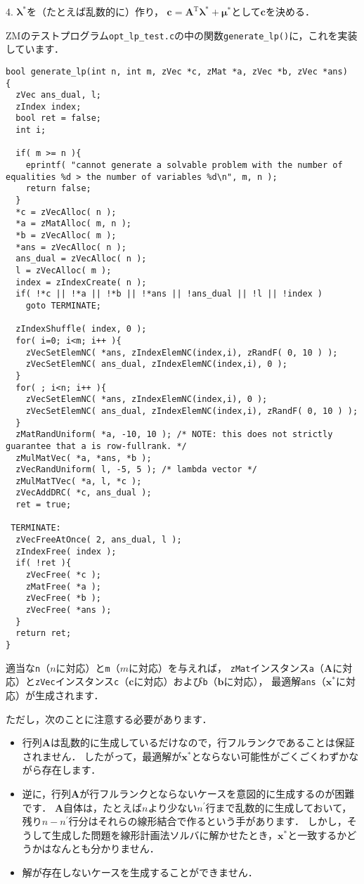 ﻿\documentclass[a4paper]{jsarticle}
\begin{document}
4. $\boldsymbol{\lambda}^{*}$を（たとえば乱数的に）作り，
$\boldsymbol{c}=\boldsymbol{A}^{\mathrm{T}}\boldsymbol{\lambda}^{*}+\boldsymbol{\mu}^{*}$として$\boldsymbol{c}$を決める．

ZMのテストプログラム\verb|opt_lp_test.c|の中の関数\verb|generate_lp()|に，これを実装しています．
\begin{verbatim}
bool generate_lp(int n, int m, zVec *c, zMat *a, zVec *b, zVec *ans)
{
  zVec ans_dual, l;
  zIndex index;
  bool ret = false;
  int i;

  if( m >= n ){
    eprintf( "cannot generate a solvable problem with the number of equalities %d > the number of variables %d\n", m, n );
    return false;
  }
  *c = zVecAlloc( n );
  *a = zMatAlloc( m, n );
  *b = zVecAlloc( m );
  *ans = zVecAlloc( n );
  ans_dual = zVecAlloc( n );
  l = zVecAlloc( m );
  index = zIndexCreate( n );
  if( !*c || !*a || !*b || !*ans || !ans_dual || !l || !index )
    goto TERMINATE;

  zIndexShuffle( index, 0 );
  for( i=0; i<m; i++ ){
    zVecSetElemNC( *ans, zIndexElemNC(index,i), zRandF( 0, 10 ) );
    zVecSetElemNC( ans_dual, zIndexElemNC(index,i), 0 );
  }
  for( ; i<n; i++ ){
    zVecSetElemNC( *ans, zIndexElemNC(index,i), 0 );
    zVecSetElemNC( ans_dual, zIndexElemNC(index,i), zRandF( 0, 10 ) );
  }
  zMatRandUniform( *a, -10, 10 ); /* NOTE: this does not strictly guarantee that a is row-fullrank. */
  zMulMatVec( *a, *ans, *b );
  zVecRandUniform( l, -5, 5 ); /* lambda vector */
  zMulMatTVec( *a, l, *c );
  zVecAddDRC( *c, ans_dual );
  ret = true;

 TERMINATE:
  zVecFreeAtOnce( 2, ans_dual, l );
  zIndexFree( index );
  if( !ret ){
    zVecFree( *c );
    zMatFree( *a );
    zVecFree( *b );
    zVecFree( *ans );
  }
  return ret;
}
\end{verbatim}

適当な\verb|n|（$n$に対応）と\verb|m|（$m$に対応）を与えれば，
\verb|zMat|インスタンス\verb|a|（$\boldsymbol{A}$に対応）と\verb|zVec|インスタンス\verb|c|（$\boldsymbol{c}$に対応）および\verb|b|（$\boldsymbol{b}$に対応），
最適解\verb|ans|（$\boldsymbol{x}^{*}$に対応）が生成されます．

ただし，次のことに注意する必要があります．
\begin{itemize}
\item{行列$\boldsymbol{A}$は乱数的に生成しているだけなので，行フルランクであることは保証されません．
したがって，最適解が$\boldsymbol{x}^{*}$とならない可能性がごくごくわずかながら存在します．
}
\item{逆に，行列$\boldsymbol{A}$が行フルランクとならないケースを意図的に生成するのが困難です．
$\boldsymbol{A}$自体は，たとえば$n$より少ない$n^{\prime}$行まで乱数的に生成しておいて，残り$n-n^{\prime}$行分はそれらの線形結合で作るという手があります．
しかし，そうして生成した問題を線形計画法ソルバに解かせたとき，$\boldsymbol{x}^{*}$と一致するかどうかはなんとも分かりません．
}
\item{解が存在しないケースを生成することができません．}
\end{itemize}
\end{document}
